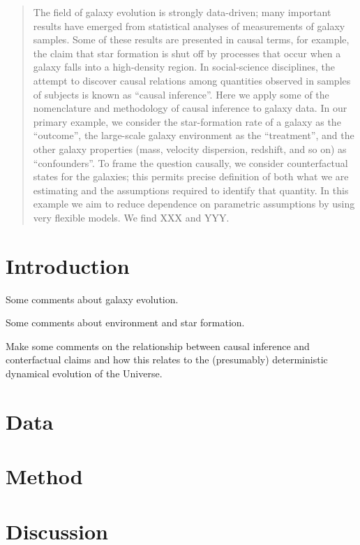 \documentclass[12pt, letterpaper, preprint]{aastex}
\begin{document}
\begin{abstract}
The field of galaxy evolution is strongly data-driven; many important
results have emerged from statistical analyses of measurements of
galaxy samples.
Some of these results are presented in causal terms, for example, the
claim that star formation is shut off by processes that occur when a
galaxy falls into a high-density region.
In social-science disciplines, the attempt to discover causal
relations among quantities observed in samples of subjects is known as
``causal inference''.
Here we apply some of the nomenclature and methodology of
causal inference to galaxy data.
In our primary example, we consider the star-formation rate of a
galaxy as the ``outcome'', the large-scale galaxy environment as the
``treatment'', and the other galaxy properties (mass, velocity
dispersion, redshift, and so on) as ``confounders''.
To frame the question causally, we consider counterfactual states for
the galaxies; this permits precise definition of both what we are
estimating and the assumptions required to identify that quantity.
In this example we aim to reduce dependence on parametric assumptions
by using very flexible models.
We find XXX and YYY.
\end{abstract}

\section{Introduction}

Some comments about galaxy evolution.

Some comments about environment and star formation.

Make some comments on the relationship between causal inference and
conterfactual claims and how this relates to the (presumably)
deterministic dynamical evolution of the Universe.

\section{Data}

\section{Method}

\section{Discussion}
\end{document}
